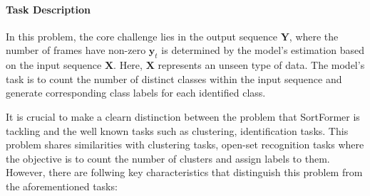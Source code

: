 \documentclass{article}
\begin{document}
\paragraph{Task Description}
In this problem, the core challenge lies in the output sequence $\mathbf{Y}$, where the number of frames have non-zero $\mathbf{y}_{t}$ is determined by the model's estimation
based on the input sequence $\mathbf{X}$. Here, $\mathbf{X}$ represents an unseen type of data. The model's task is to count the number of distinct classes
within the input sequence and generate corresponding class labels for each identified class.

It is crucial to make a clearn distinction between the problem that SortFormer is tackling and the well known tasks such as clustering, identification tasks.
This problem shares similarities with clustering tasks, open-set recognition tasks where the objective is to count the number of clusters and assign labels to them. However,
there are follwing key characteristics that distinguish this problem from the aforementioned tasks:
\end{document}
